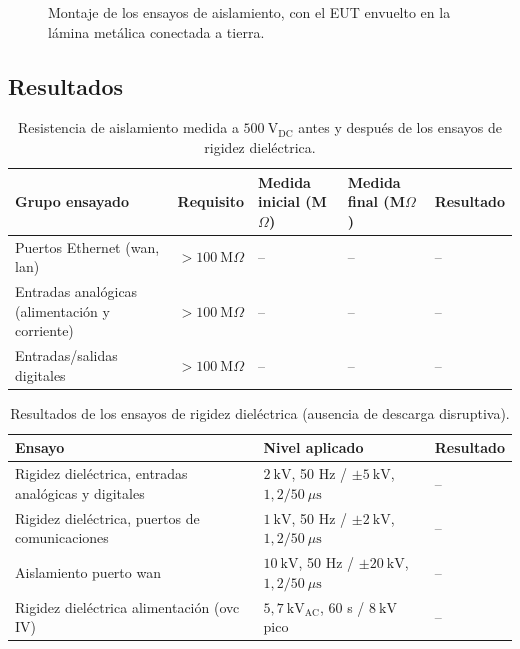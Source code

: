 \begin{figure}[htbp]
    \centering
    \caption{Montaje de los ensayos de aislamiento, con el EUT envuelto en la lámina metálica conectada a tierra.}
    \label{fig:setup_aislamiento}
\end{figure}

\subsection{Resultados}
\label{subsec:resultados_aislamiento}

\begin{table}[!h]
\centering
\small
\begin{tabular}{|p{4.0cm}|p{2.4cm}|p{2.4cm}|p{2.4cm}|p{2.0cm}|}
\hline
\textbf{Grupo ensayado} & \textbf{Requisito} & \textbf{Medida inicial (M$\Omega$)} & \textbf{Medida final (M$\Omega$)} & \textbf{Resultado} \\ \hline
Puertos Ethernet (\gls{wan}, \gls{lan}) & $> 100\ \text{M}\Omega$ & -- & -- & -- \\ \hline
Entradas analógicas (alimentación y corriente) & $> 100\ \text{M}\Omega$ & -- & -- & -- \\ \hline
Entradas/salidas digitales & $> 100\ \text{M}\Omega$ & -- & -- & -- \\ \hline
\end{tabular}
\caption{Resistencia de aislamiento medida a $500\ \text{V}_{\text{DC}}$ antes y después de los ensayos de rigidez dieléctrica.}
\label{tab:resultados_resistencia_aislamiento}
\end{table}

\begin{table}[!h]
\centering
\small
\begin{tabular}{|p{4.6cm}|p{5.6cm}|p{3.6cm}|}
\hline
\textbf{Ensayo} & \textbf{Nivel aplicado} & \textbf{Resultado} \\ \hline
Rigidez dieléctrica, entradas analógicas y digitales & $2\ \text{kV}$, 50 Hz / $\pm 5\ \text{kV}$, $1,2/50\ \mu\text{s}$ & -- \\ \hline
Rigidez dieléctrica, puertos de comunicaciones & $1\ \text{kV}$, 50 Hz / $\pm 2\ \text{kV}$, $1,2/50\ \mu\text{s}$ & -- \\ \hline
Aislamiento puerto \gls{wan} & $10\ \text{kV}$, 50 Hz / $\pm 20\ \text{kV}$, $1,2/50\ \mu\text{s}$ & -- \\ \hline
Rigidez dieléctrica alimentación (\gls{ovc} IV) & $5,7\ \text{kV}_{\text{AC}}$, 60 s / $8\ \text{kV}$ pico & -- \\ \hline
\end{tabular}
\caption{Resultados de los ensayos de rigidez dieléctrica (ausencia de descarga disruptiva).}
\label{tab:resultados_rigidez_dielectrica}
\end{table}

